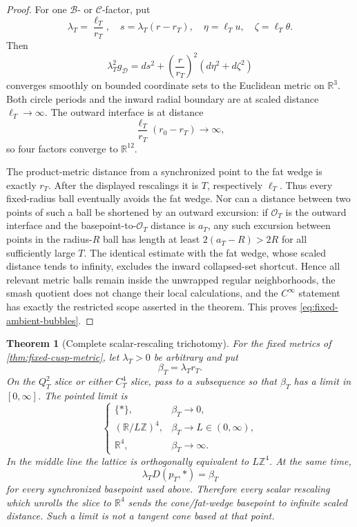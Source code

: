 \documentclass[11pt,letterpaper]{article}
\numberwithin{equation}{section}
\newtheorem{theorem}{Theorem}[section]
\theoremstyle{definition}
\theoremstyle{remark}
\newcommand{\R}{\mathbb R}
\newcommand{\Z}{\mathbb Z}
\begin{document}
\begin{proof}
For one \(\mathcal B\)- or \(\mathcal C\)-factor, put
\[
 \lambda_T=\frac{\ell_T}{r_T},\quad
 s=\lambda_T(r-r_T),\quad
 \eta=\ell_Tu,\quad\zeta=\ell_T\theta.
\]
Then
\[
 \lambda_T^2g_{\mathcal D}
 =ds^2+\left(\frac r{r_T}\right)^2(d\eta^2+d\zeta^2)
\]
converges smoothly on bounded coordinate sets to the Euclidean metric on
\(\R^3\).  Both circle periods and the inward radial boundary are at
scaled distance \(\ell_T\to\infty\).  The outward interface is at distance
\[
 \frac{\ell_T}{r_T}(r_0-r_T)\longrightarrow\infty,
\]
so four factors converge to \(\R^{12}\).

The product-metric distance from a synchronized point to the fat wedge is
exactly \(r_T\).  After the displayed rescalings it is \(T\), respectively
\(\ell_T\).  Thus every fixed-radius ball eventually avoids the fat
wedge.  Nor can a distance between two points of such a ball be shortened
by an outward excursion: if \(\mathcal O_T\) is the outward interface and
the basepoint-to-\(\mathcal O_T\) distance is \(a_T\), any such excursion
between points in the radius-\(R\) ball has length at least
\(2(a_T-R)>2R\) for all sufficiently large \(T\).  The identical estimate
with the fat wedge, whose scaled distance tends to infinity, excludes the
inward collapsed-set shortcut.  Hence all relevant metric balls remain
inside the unwrapped regular neighborhoods, the smash quotient does not
change their local calculations, and the \(C^\infty\) statement has exactly
the restricted scope asserted in the theorem.
This proves \cref{eq:fixed-ambient-bubbles}.
\end{proof}

\begin{theorem}[Complete scalar-rescaling trichotomy]
\label{thm:scaling-trichotomy}
For the fixed metrics of \cref{thm:fixed-cusp-metric}, let
\(\lambda_T>0\) be arbitrary and put
\[
 \beta_T=\lambda_Tr_T.
\]
On the \(Q_T^2\) slice or either \(C_T^4\) slice, pass to a subsequence
so that \(\beta_T\) has a limit in \([0,\infty]\).  The pointed limit is
\begin{equation}
 \begin{cases}
  \{*\},&\beta_T\longrightarrow0,\\
  (\R/L\Z)^4,&\beta_T\longrightarrow L\in(0,\infty),\\
  \R^4,&\beta_T\longrightarrow\infty.
 \end{cases}
 \label{eq:scaling-trichotomy}
\end{equation}
In the middle line the lattice is orthogonally equivalent to
\(L\Z^4\).  At the same time,
\begin{equation}
 \lambda_TD(p_T,*)=\beta_T
 \label{eq:vertex-distance}
\end{equation}
for every synchronized basepoint used above.  Therefore every scalar
rescaling which unrolls the slice to \(\R^4\) sends the cone/fat-wedge
basepoint to infinite scaled distance.  Such a limit is not a tangent
cone based at that point.
\end{theorem}
\end{document}
